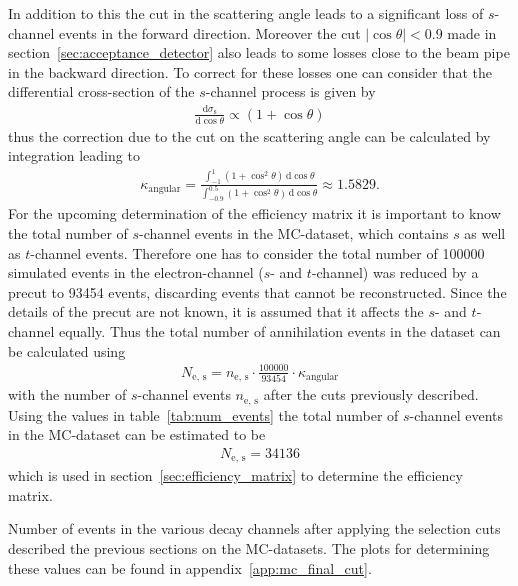 \documentclass[11pt, a4paper]{article}
\numberwithin{equation}{section}
\newcommand\dinf[1]{ \,\mathrm{d}#1 }
\newcommand\deriv[2] { \frac{\mathrm{d} #1}{\mathrm{d} #2} }
\begin{document}
In addition to this the cut in the scattering angle leads to a significant loss of $s$-channel events in the forward direction.
Moreover the cut $\left| \cos\theta \right| < 0.9$ made in section~\ref{sec:acceptance_detector} also leads to some losses close to the beam pipe in the backward direction.
To correct for these losses one can consider that the differential cross-section of the $s$-channel process is given by
\begin{align*}
	\deriv{\sigma_\mathrm{s}}{\cos\theta} \propto \left( 1 + \cos\theta \right)
\end{align*}
thus the correction due to the cut on the scattering angle can be calculated by integration leading to
\begin{align*}
\kappa_\mathrm{angular} = \frac{\int_{-1}^{1}(1 + \cos^2\theta) \dinf{\cos\theta}}{\int_{-0.9}^{0.5}(1 + \cos^2\theta) \dinf{\cos\theta}} \approx 1.5829 \text{.}
\end{align*}
For the upcoming determination of the efficiency matrix it is important to know the total number of $s$-channel events in the MC-dataset, which contains $s$ as well as $t$-channel events.
Therefore one has to consider the total number of \num{100000} simulated events in the electron-channel ($s$- and $t$-channel) was reduced by a precut to \num{93454} events, discarding events that cannot be reconstructed.
Since the details of the precut are not known, it is assumed that it affects the $s$- and $t$-channel equally.
Thus the total number of annihilation events in the dataset can be calculated using
\begin{align*}
	N_\mathrm{e,\,s} = n_\mathrm{e,\,s} \cdot \frac{100000}{93454} \cdot \kappa_\mathrm{angular}
\end{align*}
with the number of $s$-channel events $n_\mathrm{e,\,s}$ after the cuts previously described.
Using the values in table~\ref{tab:num_events} the total number of $s$-channel events in the MC-dataset can be estimated to be
\begin{align*}
	N_\mathrm{e,\,s} = 34136
\end{align*}
which is used in section~\ref{sec:efficiency_matrix} to determine the efficiency matrix.

\begin{table}[h]
	\centering
	
	\caption{Number of events in the various decay channels after applying the selection cuts described the previous sections on the MC-datasets. The plots for determining these values can be found in appendix~\ref{app:mc_final_cut}.}
	\label{tab:num_events}
\end{table}
\end{document}
